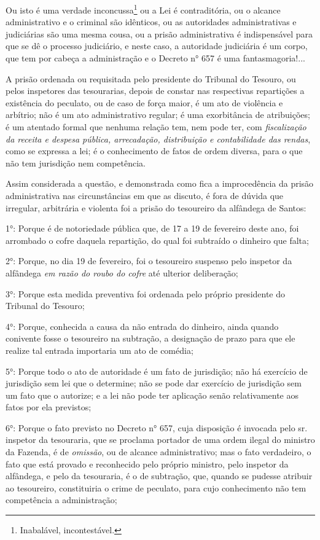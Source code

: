 Ou isto é uma verdade inconcussa\footnote{Inabalável, incontestável.} ou
a Lei é contraditória, ou o alcance administrativo e o criminal são
idênticos, ou as autoridades administrativas e judiciárias são uma mesma
cousa, ou a prisão administrativa é indispensável para que se dê o
processo judiciário, e neste caso, a autoridade judiciária é um corpo,
que tem por cabeça a administração e o Decreto n° 657 é uma
fantasmagoria!...

A prisão ordenada ou requisitada pelo presidente do Tribunal do Tesouro,
ou pelos inspetores das tesourarias, depois de constar nas respectivas
repartições a existência do peculato, ou de caso de força maior, é um
ato de violência e arbítrio; não é um ato administrativo regular; é uma
exorbitância de atribuições; é um atentado formal que nenhuma relação
tem, nem pode ter, com \emph{fiscalização da receita e despesa pública,
arrecadação, distribuição e contabilidade das rendas}, como se expressa
a lei; é o conhecimento de fatos de ordem diversa, para o que não tem
jurisdição nem competência.

Assim considerada a questão, e demonstrada como fica a improcedência da
prisão administrativa nas circunstâncias em que as discuto, é fora de
dúvida que irregular, arbitrária e violenta foi a prisão do tesoureiro
da alfândega de Santos:

1°: Porque é de notoriedade pública que, de 17 a 19 de fevereiro deste
ano, foi arrombado o cofre daquela repartição, do qual foi subtraído o
dinheiro que falta;

2°: Porque, no dia 19 de fevereiro, foi o tesoureiro suspenso pelo
inspetor da alfândega \emph{em razão do roubo do cofre} até ulterior
deliberação;

3°: Porque esta medida preventiva foi ordenada pelo próprio presidente
do Tribunal do Tesouro;

4°: Porque, conhecida a causa da não entrada do dinheiro, ainda quando
conivente fosse o tesoureiro na subtração, a designação de prazo para
que ele realize tal entrada importaria um ato de comédia;

5°: Porque todo o ato de autoridade é um fato de jurisdição; não há
exercício de jurisdição sem lei que o determine; não se pode dar
exercício de jurisdição sem um fato que o autorize; e a lei não pode ter
aplicação senão relativamente aos fatos por ela previstos;

6°: Porque o fato previsto no Decreto n° 657, cuja disposição é invocada
pelo sr. inspetor da tesouraria, que se proclama portador de uma ordem
ilegal do ministro da Fazenda, é de \emph{omissão}, ou de alcance
administrativo; mas o fato verdadeiro, o fato que está provado e
reconhecido pelo próprio ministro, pelo inspetor da alfândega, e pelo da
tesouraria, é o de subtração, que, quando se pudesse atribuir ao
tesoureiro, constituiria o crime de peculato, para cujo conhecimento não
tem competência a administração;

